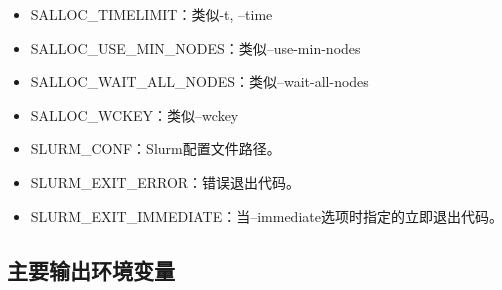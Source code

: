 \begin{itemize}
	\item SALLOC\_TIMELIMIT：类似-t, --time
	\item SALLOC\_USE\_MIN\_NODES：类似--use-min-nodes
	\item SALLOC\_WAIT\_ALL\_NODES：类似--wait-all-nodes
	\item SALLOC\_WCKEY：类似--wckey
	\item SLURM\_CONF：Slurm配置文件路径。
	\item SLURM\_EXIT\_ERROR：错误退出代码。
	\item SLURM\_EXIT\_IMMEDIATE：当--immediate选项时指定的立即退出代码。
\end{itemize}

\subsection{主要输出环境变量}
